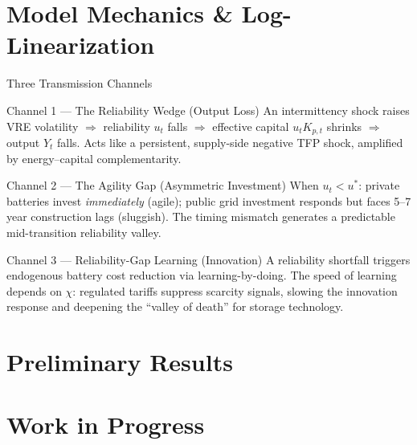 \documentclass[aspectratio=169,10pt]{beamer}
\begin{document}
\section{Model Mechanics \& Log-Linearization}



\begin{frame}{Three Transmission Channels}
  \begin{block}{Channel 1 --- The Reliability Wedge (Output Loss)}
    \small An intermittency shock raises VRE volatility $\Rightarrow$ reliability $u_t$ falls $\Rightarrow$ effective capital $u_t K_{p,t}$ shrinks $\Rightarrow$ output $Y_t$ falls. Acts like a persistent, supply-side negative TFP shock, amplified by energy--capital complementarity.
  \end{block}
  \vspace{0.3em}
  \begin{block}{Channel 2 --- The Agility Gap (Asymmetric Investment)}
    \small When $u_t < u^*$: private batteries invest \textit{immediately} (agile); public grid investment responds but faces 5--7 year construction lags (sluggish). The timing mismatch generates a predictable mid-transition reliability valley.
  \end{block}
  \vspace{0.3em}
  \begin{block}{Channel 3 --- Reliability-Gap Learning (Innovation)}
    \small A reliability shortfall triggers endogenous battery cost reduction via learning-by-doing. The speed of learning depends on $\chi$: regulated tariffs suppress scarcity signals, slowing the innovation response and deepening the ``valley of death'' for storage technology.
  \end{block}
\end{frame}

\section{Preliminary Results}

\section{Work in Progress}
\end{document}
